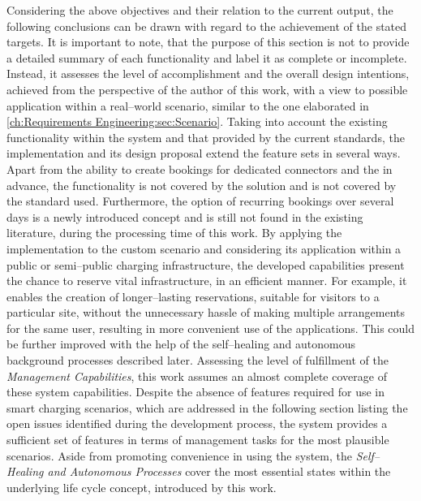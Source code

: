 \noindent Considering the above objectives and their relation to the current output, the following conclusions can be drawn with regard to the achievement of the stated targets. It is important to note, that the purpose of this section is not to provide a detailed summary of each functionality and label it as complete or incomplete. 
Instead, it assesses the level of accomplishment and the overall design intentions, achieved from the perspective of the author of this work, with a view to possible application within a real--world scenario, similar to the one elaborated in \ref{ch:Requirements Engineering:sec:Scenario}.
Taking into account the existing functionality within the system and that provided by the current standards, the implementation and its design proposal extend the feature sets in several ways.
Apart from the ability to create bookings for dedicated connectors and the  in advance, the functionality is not covered by the solution and is not covered by the standard used.
Furthermore, the option of recurring bookings over several days is a newly introduced concept and is still not found in the existing literature, during the processing time of this work.
By applying the implementation to the custom scenario and considering its application within a public or semi--public charging infrastructure, the developed capabilities present the chance to reserve vital infrastructure, in an efficient manner.
For example, it enables the creation of longer--lasting reservations, suitable for visitors to a particular site, without the unnecessary hassle of making multiple arrangements for the same user, resulting in more convenient use of the applications. This could be further improved with the help of the self--healing and autonomous background processes described later.
Assessing the level of fulfillment of the \textit{Management Capabilities}, this work assumes an almost complete coverage of these system capabilities. 
Despite the absence of features required for use in smart charging scenarios, which are addressed in the following section listing the open issues identified during the development process, the system provides a sufficient set of features in terms of management tasks for the most plausible scenarios.
Aside from promoting convenience in using the system, the \textit{Self--Healing and Autonomous Processes} cover the most essential states within the underlying life cycle concept, introduced by this work.
